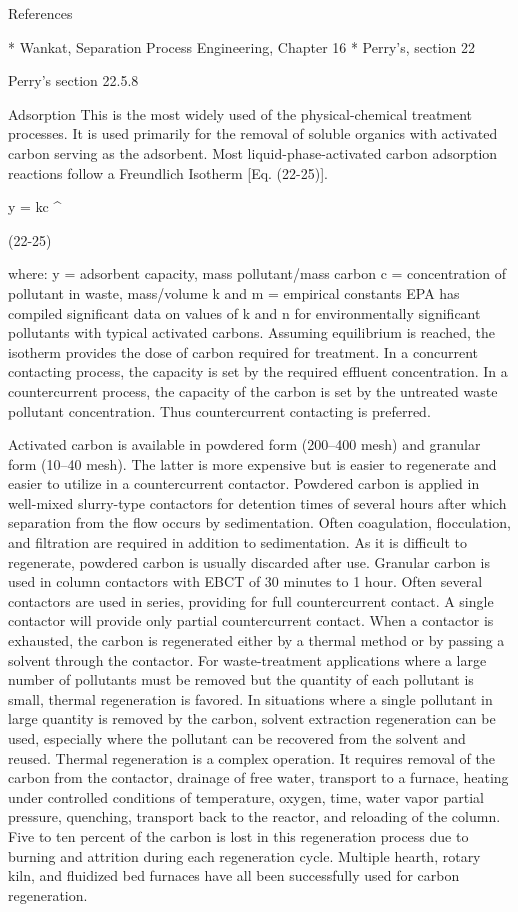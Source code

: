 References

* Wankat, Separation Process Engineering, Chapter 16
* Perry's, section 22

Perry's section 22.5.8

Adsorption This is the most widely used of the physical-chemical treatment processes. It is used primarily for the removal of soluble organics with activated carbon serving as the adsorbent. Most liquid-phase-activated carbon adsorption reactions follow a Freundlich Isotherm [Eq. (22-25)].

y = kc ^

(22-25)

where:            y = adsorbent capacity, mass pollutant/mass carbon
                      c = concentration of pollutant in waste, mass/volume
             k and m = empirical constants
EPA has compiled significant data on values of k and n for environmentally significant pollutants with typical activated carbons. Assuming equilibrium is reached, the isotherm provides the dose of carbon required for treatment. In a concurrent contacting process, the capacity is set by the required effluent concentration. In a countercurrent process, the capacity of the carbon is set by the untreated waste pollutant concentration. Thus countercurrent contacting is preferred.

Activated carbon is available in powdered form (200–400 mesh) and granular form (10–40 mesh). The latter is more expensive but is easier to regenerate and easier to utilize in a countercurrent contactor. Powdered carbon is applied in well-mixed slurry-type contactors for detention times of several hours after which separation from the flow occurs by sedimentation. Often coagulation, flocculation, and filtration are required in addition to sedimentation. As it is difficult to regenerate, powdered carbon is usually discarded after use. Granular carbon is used in column contactors with EBCT of 30 minutes to 1 hour. Often several contactors are used in series, providing for full countercurrent contact. A single contactor will provide only partial countercurrent contact. When a contactor is exhausted, the carbon is regenerated either by a thermal method or by passing a solvent through the contactor. For waste-treatment applications where a large number of pollutants must be removed but the quantity of each pollutant is small, thermal regeneration is favored. In situations where a single pollutant in large quantity is removed by the carbon, solvent extraction regeneration can be used, especially where the pollutant can be recovered from the solvent and reused. Thermal regeneration is a complex operation. It requires removal of the carbon from the contactor, drainage of free water, transport to a furnace, heating under controlled conditions of temperature, oxygen, time, water vapor partial pressure, quenching, transport back to the reactor, and reloading of the column. Five to ten percent of the carbon is lost in this regeneration process due to burning and attrition during each regeneration cycle. Multiple hearth, rotary kiln, and fluidized bed furnaces have all been successfully used for carbon regeneration.

